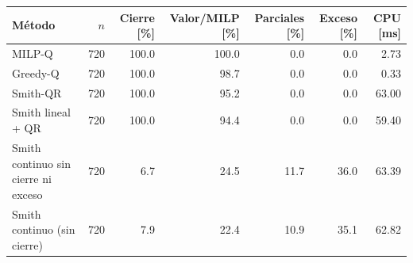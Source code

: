\begin{tabular}{lrrrrrr}
\toprule
Método & $n$ & Cierre [\%] & Valor/MILP [\%] & Parciales [\%] & Exceso [\%] & CPU [ms] \\
\midrule
MILP-Q & 720 & 100.0 & 100.0 & 0.0 & 0.0 & 2.73 \\
Greedy-Q & 720 & 100.0 & 98.7 & 0.0 & 0.0 & 0.33 \\
Smith-QR & 720 & 100.0 & 95.2 & 0.0 & 0.0 & 63.00 \\
Smith lineal + QR & 720 & 100.0 & 94.4 & 0.0 & 0.0 & 59.40 \\
Smith continuo sin cierre ni exceso & 720 & 6.7 & 24.5 & 11.7 & 36.0 & 63.39 \\
Smith continuo (sin cierre) & 720 & 7.9 & 22.4 & 10.9 & 35.1 & 62.82 \\
\bottomrule
\end{tabular}
